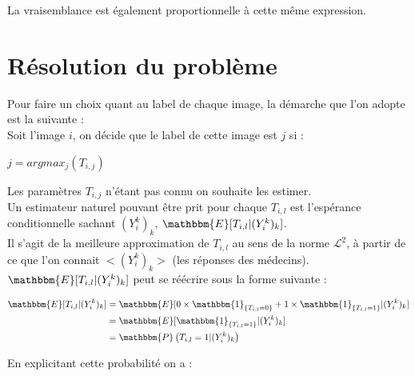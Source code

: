 \documentclass[frenchb]{report}
\newcommand{\1}{\mathbbm{1}}
\newcommand{\E}{\mathbbm{E}}
\newcommand{\prob}{\mathbbm{P}}
\theoremstyle{definition}\newtheorem{defn}{Définition}
\theoremstyle{definition}\newtheorem{exm}{Exemple}
\theoremstyle{definition}\newtheorem{nota}{Notation}
\theoremstyle{definition}\newtheorem{rem}{Remarque}
\begin{document}
La vraisemblance est également proportionnelle à cette même expression.


\section{Résolution du problème}

Pour faire un choix quant au label de chaque image, la démarche que l'on adopte est la suivante :\\

Soit l'image $i$, on décide que le label de cette image est $j$ si : \\
\begin{center}
	$j = argmax_j (T_{i,j})$
\end{center}

Les paramètres $T_{i,j}$ n'étant pas connu on souhaite les estimer.\\
Un estimateur naturel pouvant être prit pour chaque $T_{i,l}$ est l'espérance conditionnelle sachant $(Y^k_i)_k$, $\E[T_{i,l}|(Y^k_i)_k]$. \\
Il s'agit de la meilleure approximation de $T_{i,l}$ au sens de la norme $\mathcal{L}^2$, à partir de ce que l'on connait $<(Y^k_i)_k>$ (les réponses des médecins).\\

$\E[T_{i,l}|(Y^k_i)_k]$ peut se réécrire sous la forme suivante : 

\begin{center}
	\begin{align*}
		\E[T_{i,l}|(Y^k_i)_k] &= \E[0 \times \1_{\{T_{i,l} = 0\}} + 1 \times \1_{\{T_{i,l} = 1\}}|(Y^k_i)_k] \\
		&= \E[\1_{\{T_{i,l} = 1\}}|(Y^k_i)_k]\\
		&= \prob\left( T_{i,l} = 1 |(Y^k_i)_k \right)\\
	\end{align*}
\end{center}

En explicitant cette probabilité on a : 
\end{document}
